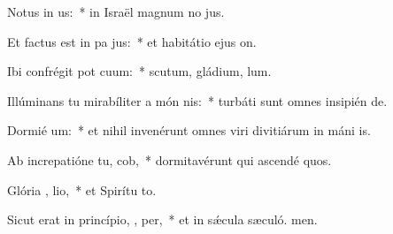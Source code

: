\item Notus in  us:~* in Israël magnum no jus.
\item Et factus est in pa  jus:~* et habitátio ejus  on.
\item Ibi confrégit pot cuum:~* scutum, gládium,  lum.
\item Illúminans tu mirabíliter a món nis:~* turbáti sunt omnes insipién de.
\item Dormié  um:~* et nihil invenérunt omnes viri divitiárum in máni is.
\item Ab increpatióne tu,  cob,~* dormitavérunt qui ascendé quos.
\item Glória ,  lio,~* et Spirítu to.
\item Sicut erat in princípio,  ,  per,~* et in sǽcula sæculó. men.
